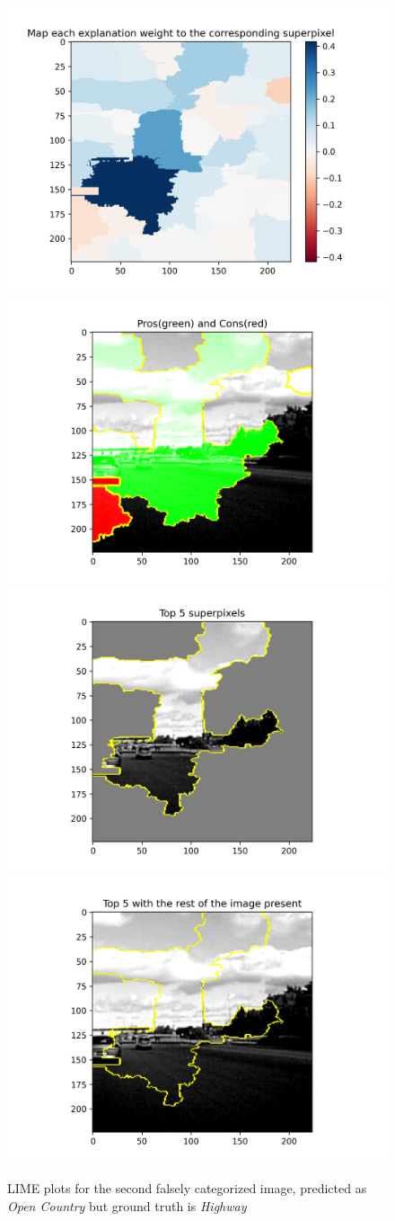 \begin{figure}[htbp]
    \centering
    \includegraphics[width=0.49\linewidth]{lame_2_Map each explanation weight to the corresponding superpixel.png}
    \includegraphics[width=0.49\linewidth]{lame_2_Pros(green) and Cons(red).png}
    \includegraphics[width=0.49\linewidth]{lame_2_Top 5 superpixels.png}
    \includegraphics[width=0.49\linewidth]{lame_2_Top 5 with the rest of the image present.png}
    \caption{LIME plots for the second falsely categorized image, predicted as \emph{Open Country} but ground truth is \emph{Highway}}
    \label{fig:LIME_2}
\end{figure}

